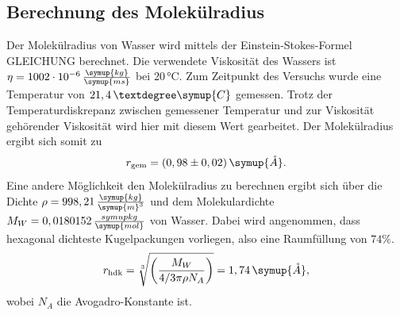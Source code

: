 \subsection{Berechnung des Molekülradius}
Der Molekülradius von Wasser wird mittels der Einstein-Stokes-Formel GLEICHUNG berechnet. 
Die verwendete Viskosität des Wassers ist $\eta = 1002 \cdot 10^{-6}\, \frac{\symup{kg}}{\symup{m s}}$ \cite{visko}
bei 20\,°C. Zum Zeitpunkt des Versuchs wurde eine Temperatur von $21,4\, °\symup{C}$ gemessen.
Trotz der Temperaturdiskrepanz zwischen gemessener Temperatur und zur Viskosität gehörender Viskosität 
wird hier mit diesem Wert gearbeitet. Der Molekülradius ergibt sich somit zu 
\begin{equation*}
    r_{\text{gem}} = (0,98 \pm 0,02) \, \symup{\mathring{A}}. 
\end{equation*} 
Eine andere Möglichkeit den Molekülradius zu berechnen ergibt sich über die Dichte $\rho = 998,21 \,\frac{\symup{kg}}{\symup{m}^3}$
und dem Molekulardichte $M_W = 0,0180152 \, \frac{symup{kg}}{\symup{mol}}$ von Wasser\cite{visko}.
Dabei wird angenommen, dass hexagonal dichteste Kugelpackungen vorliegen, also eine Raumfüllung von $74\%$.
\begin{equation*}
    r_{\text{hdk}} = \sqrt[3]{\left( \frac{M_W}{4/3 \pi \rho N_A}  \right)} = 1,74 \, \symup{\mathring{A}},
\end{equation*}
wobei $N_A$ die Avogadro-Konstante ist.
